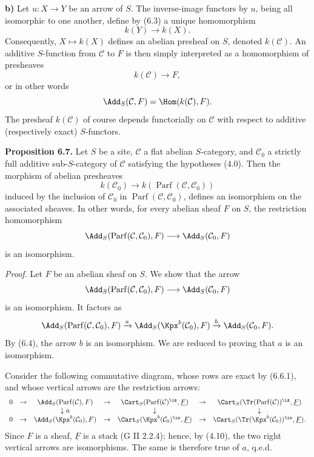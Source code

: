 \documentclass[11pt]{article}
\newcommand{\Parf}{\operatorname{Parf}}
\begin{document}
\textbf{b)} Let \(u:X\to Y\) be an arrow of \(S\). The inverse-image functors by \(u\), being all isomorphic to one another, define by (6.3) a unique homomorphism
\[
  k(Y)\longrightarrow k(X).
\]
Consequently, \(X\mapsto k(X)\) defines an abelian presheaf on \(S\), denoted \(k(\mathcal C)\). An additive \(S\)-function from \(\mathcal C\) to \(F\) is then simply interpreted as a homomorphism of presheaves
\[
  k(\mathcal C)\longrightarrow F,
\]
or in other words
\[
  \Add_S(\mathcal C,F)=\Hom(k(\mathcal C),F).
\]
The presheaf \(k(\mathcal C)\) of course depends functorially on \(\mathcal C\) with respect to additive (respectively exact) \(S\)-functors.

\textbf{Proposition 6.7.} Let \(S\) be a site, \(\mathcal C\) a flat abelian \(S\)-category, and \(\mathcal C_0\) a strictly full additive sub-\(S\)-category of \(\mathcal C\) satisfying the hypotheses (4.0). Then the morphism of abelian presheaves
\[
  k(\mathcal C_0)\longrightarrow k(\Parf(\mathcal C,\mathcal C_0))
\]
induced by the inclusion of \(\mathcal C_0\) in \(\Parf(\mathcal C,\mathcal C_0)\), defines an isomorphism on the associated sheaves. In other words, for every abelian sheaf \(F\) on \(S\), the restriction homomorphism
\[
  \Add_S(\Parf(\mathcal C,\mathcal C_0),F)
  \longrightarrow
  \Add_S(\mathcal C_0,F)
\]
is an isomorphism.

\emph{Proof.} Let \(F\) be an abelian sheaf on \(S\). We show that the arrow
\[
  \Add_S(\Parf(\mathcal C,\mathcal C_0),F)
  \longrightarrow
  \Add_S(\mathcal C_0,F)
\]
is an isomorphism. It factors as
\[
\Add_S(\Parf(\mathcal C,\mathcal C_0),F)
 \xrightarrow{a}
\Add_S(\Kpx^b(\mathcal C_0),F)
 \xrightarrow{b}
\Add_S(\mathcal C_0,F).
\]
By (6.4), the arrow \(b\) is an isomorphism. We are reduced to proving that \(a\) is an isomorphism.

Consider the following commutative diagram, whose rows are exact by (6.6.1), and whose vertical arrows are the restriction arrows:
\[
\begin{array}{ccccccccc}
0&\to&\Add_S(\Parf(\mathcal C),F)&\to&\Cart_S(\Parf(\mathcal C)^{\is},\underline F)&\to&\Cart_S(\Tr(\Parf(\mathcal C))^{\is},\underline F)\\
&&\downarrow a&&\downarrow&&\downarrow\\
0&\to&\Add_S(\Kpx^b(\mathcal C_0),F)&\to&\Cart_S(\Kpx^b(\mathcal C_0)^{\is},\underline F)&\to&\Cart_S(\Tr(\Kpx^b(\mathcal C_0))^{\is},\underline F).
\end{array}
\]
Since \(F\) is a sheaf, \(\underline F\) is a stack (G II 2.2.4); hence, by (4.10), the two right vertical arrows are isomorphisms. The same is therefore true of \(a\), q.e.d.
\end{document}
